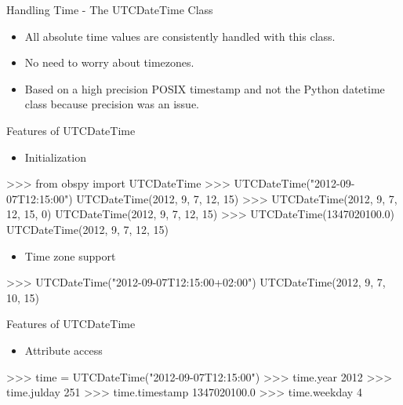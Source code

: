 \documentclass[handout]{beamer}
\begin{document}
\begin{frame}{Handling Time - The UTCDateTime Class}
    \begin{itemize}
        \item All absolute time values are consistently handled with this class.
        \item No need to worry about timezones.
        \item Based on a high precision POSIX timestamp and not the Python datetime class because precision was an issue.
    \end{itemize}
\end{frame}


\begin{frame}{Features of UTCDateTime}
    \begin{itemize}
        \item Initialization
    \end{itemize}
\begin{myColorBox}{0.95}{}
\begin{python}
>>> from obspy import UTCDateTime
>>> UTCDateTime("2012-09-07T12:15:00")
UTCDateTime(2012, 9, 7, 12, 15)
>>> UTCDateTime(2012, 9, 7, 12, 15, 0)
UTCDateTime(2012, 9, 7, 12, 15)
>>> UTCDateTime(1347020100.0)
UTCDateTime(2012, 9, 7, 12, 15)
\end{python}
\end{myColorBox}


\begin{itemize}
    \item Time zone support
\end{itemize}

\begin{myColorBox}{0.95}{}
\begin{python}
>>> UTCDateTime("2012-09-07T12:15:00+02:00")
UTCDateTime(2012, 9, 7, 10, 15)
\end{python}
\end{myColorBox}


\end{frame}


\begin{frame}{Features of UTCDateTime}
    \begin{itemize}
        \item Attribute access
    \end{itemize}
\begin{myColorBox}{0.95}{}
\begin{python}
>>> time = UTCDateTime("2012-09-07T12:15:00")
>>> time.year
2012
>>> time.julday
251
>>> time.timestamp
1347020100.0
>>> time.weekday
4
\end{python}
\end{myColorBox}



\end{frame}
\end{document}
